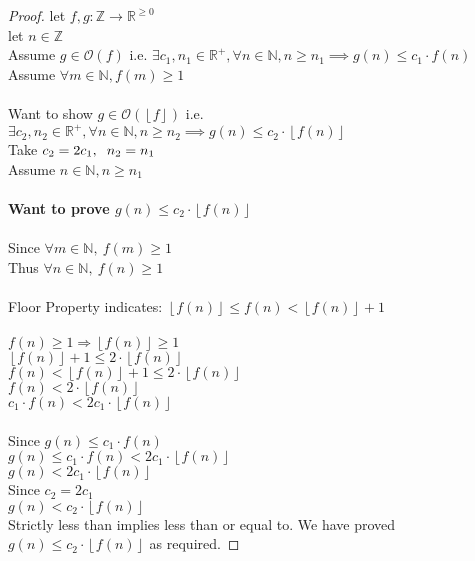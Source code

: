 \documentclass[11pt]{article}
\newcommand{\floor}[1]{\left\lfloor #1 \right\rfloor}
\begin{document}
\begin{enumerate}
\begin{proof}
let $f, g: \mathbb{Z} \to \mathbb{R}^{\geq 0}$\\
let $n \in \mathbb{Z}$\\
Assume $g \in \mathcal{O}(f)$ i.e. $\exists c_{1}, n_{1} \in \mathbb{R}^{+}, \forall n \in \mathbb{N}, n\geq n_{1} \implies g(n) \leq c_{1} \cdot f(n)$ \\
Assume $\forall m \in \mathbb{N}, f(m) \geq 1$\\
\\
Want to show $g \in \mathcal{O}(\floor{f})$ i.e. $\exists c_{2}, n_{2} \in \mathbb{R}^{+}, \forall n \in \mathbb{N}, n\geq n_{2} \implies g(n) \leq c_{2} \cdot \floor{f(n)}$ \\
Take $c_{2} = 2c_{1}, \hspace{2mm} n_{2} = n_{1}$ \\
Assume $n \in \mathbb{N}, n \geq n_{1}$\\
\\
\textbf{Want to prove $g(n) \leq c_{2} \cdot \floor{f(n)}$} \\
\\
Since $\forall m \in \mathbb{N},~ f(m) \geq 1$\\
Thus $\forall n \in \mathbb{N},~f(n) \geq 1 $\\
\\
Floor Property indicates:
$\floor{f(n)} \leq f(n) < \floor{f(n)} + 1$\\
\\
$f(n)\geq 1 \Rightarrow \floor{f(n)} \geq 1$\\
$\floor{f(n)} + 1 \leq 2\cdot\floor{f(n)}$\\
$f(n) < \floor{f(n)} + 1 \leq 2\cdot \floor{f(n)}$\\
$f(n)< 2\cdot \floor{f(n)}$\\
$c_{1} \cdot f(n)< 2c_{1}\cdot \floor{f(n)}$\\
\\
Since $g(n) \leq c_{1} \cdot f(n)$ \\
$g(n) \leq c_{1} \cdot f(n) < 2c_{1} \cdot \floor{f(n)}$ \\
$g(n)< 2c_{1} \cdot \floor{f(n)}$ \\
Since $c_{2} = 2c_{1}$ \\
$g(n) < c_{2} \cdot \floor{f(n)}$ \\
Strictly less than implies less than or equal to. We have proved $g(n) \leq c_{2} \cdot \floor{f(n)}$ as required.

\end{proof}
\end{enumerate}
\end{document}
